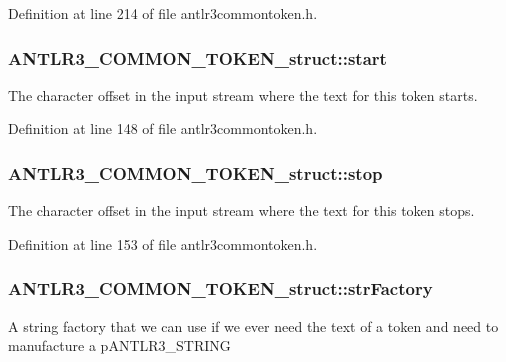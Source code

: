 Definition at line 214 of file antlr3commontoken.\-h.

\hypertarget{struct_a_n_t_l_r3___c_o_m_m_o_n___t_o_k_e_n__struct_a6ffe3fc2cf55c871f461c6022e112f7f}{
\subsubsection[{start}]{ A\-N\-T\-L\-R3\-\_\-\-C\-O\-M\-M\-O\-N\-\_\-\-T\-O\-K\-E\-N\-\_\-struct\-::start}}\label{struct_a_n_t_l_r3___c_o_m_m_o_n___t_o_k_e_n__struct_a6ffe3fc2cf55c871f461c6022e112f7f}
The character offset in the input stream where the text for this token starts. 

Definition at line 148 of file antlr3commontoken.\-h.

\hypertarget{struct_a_n_t_l_r3___c_o_m_m_o_n___t_o_k_e_n__struct_afaeee86318692e290549a3fe14d4ab6d}{
\subsubsection[{stop}]{ A\-N\-T\-L\-R3\-\_\-\-C\-O\-M\-M\-O\-N\-\_\-\-T\-O\-K\-E\-N\-\_\-struct\-::stop}}\label{struct_a_n_t_l_r3___c_o_m_m_o_n___t_o_k_e_n__struct_afaeee86318692e290549a3fe14d4ab6d}
The character offset in the input stream where the text for this token stops. 

Definition at line 153 of file antlr3commontoken.\-h.

\hypertarget{struct_a_n_t_l_r3___c_o_m_m_o_n___t_o_k_e_n__struct_a1d384f2213411e3a2d607ad357131e92}{
\subsubsection[{str\-Factory}]{ A\-N\-T\-L\-R3\-\_\-\-C\-O\-M\-M\-O\-N\-\_\-\-T\-O\-K\-E\-N\-\_\-struct\-::str\-Factory}}\label{struct_a_n_t_l_r3___c_o_m_m_o_n___t_o_k_e_n__struct_a1d384f2213411e3a2d607ad357131e92}
A string factory that we can use if we ever need the text of a token and need to manufacture a p\-A\-N\-T\-L\-R3\-\_\-\-S\-T\-R\-I\-N\-G 

